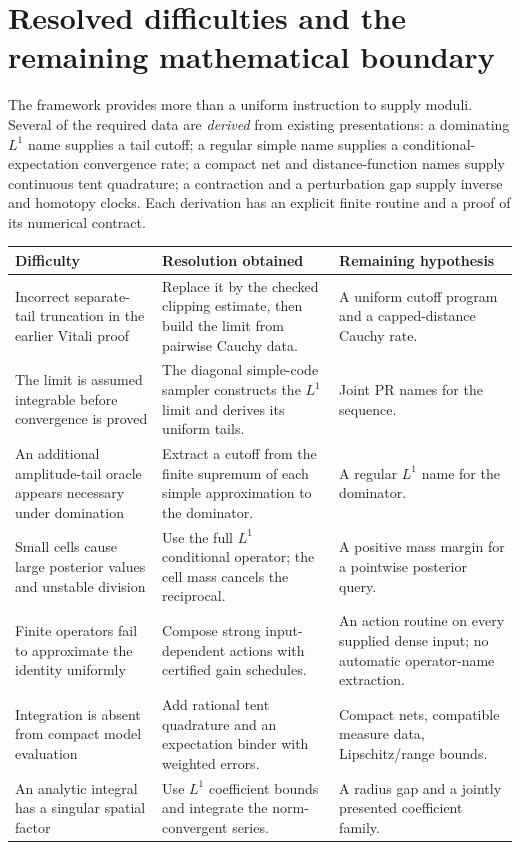 \section{Resolved difficulties and the remaining mathematical boundary}\label{sec:resolved}

The framework provides more than a uniform instruction to supply moduli.
Several of the required data are \emph{derived} from existing presentations:
a dominating $L^1$ name supplies a tail cutoff; a regular simple name
supplies a conditional-expectation convergence rate; a compact net and
distance-function names supply continuous tent quadrature; a contraction
and a perturbation gap supply inverse and homotopy clocks. Each derivation
has an explicit finite routine and a proof of its numerical contract.

\begin{longtable}{@{}p{}p{}p{}@{}}
\toprule
Difficulty & Resolution obtained & Remaining hypothesis\\
\midrule
\endhead
Incorrect separate-tail truncation in the earlier Vitali proof & Replace it by the checked clipping estimate, then build the limit from pairwise Cauchy data. & A uniform cutoff program and a capped-distance Cauchy rate.\\
The limit is assumed integrable before convergence is proved & The diagonal simple-code sampler constructs the $L^1$ limit and derives its uniform tails. & Joint PR names for the sequence.\\
An additional amplitude-tail oracle appears necessary under domination & Extract a cutoff from the finite supremum of each simple approximation to the dominator. & A regular $L^1$ name for the dominator.\\
Small cells cause large posterior values and unstable division & Use the full $L^1$ conditional operator; the cell mass cancels the reciprocal. & A positive mass margin for a pointwise posterior query.\\
Finite operators fail to approximate the identity uniformly & Compose strong input-dependent actions with certified gain schedules. & An action routine on every supplied dense input; no automatic operator-name extraction.\\
Integration is absent from compact model evaluation & Add rational tent quadrature and an expectation binder with weighted errors. & Compact nets, compatible measure data, Lipschitz/range bounds.\\
An analytic integral has a singular spatial factor & Use $L^1$ coefficient bounds and integrate the norm-convergent series. & A radius gap and a jointly presented coefficient family.\\

\end{longtable}
